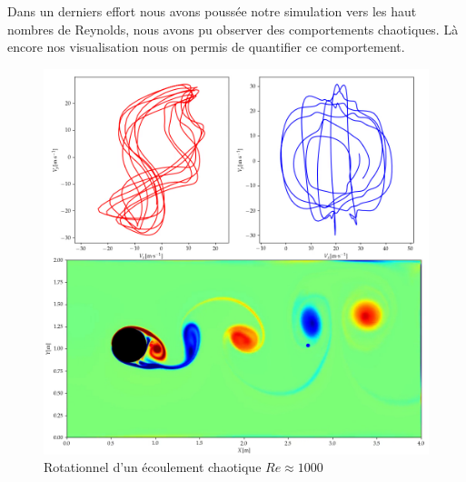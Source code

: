 Dans un derniers effort nous avons poussée notre simulation vers les haut nombres de Reynolds, nous avons pu observer des 
comportements chaotiques. Là encore nos visualisation nous on permis de quantifier ce comportement.

\begin{figure}[hbtp]
  \centering
  \includegraphics[width=\linewidth]{Fig/little_chaos.png}
  \caption{Rotationnel d'un écoulement chaotique $Re \approx 1000$}
  \label{fig:lChaos}
\end{figure}

